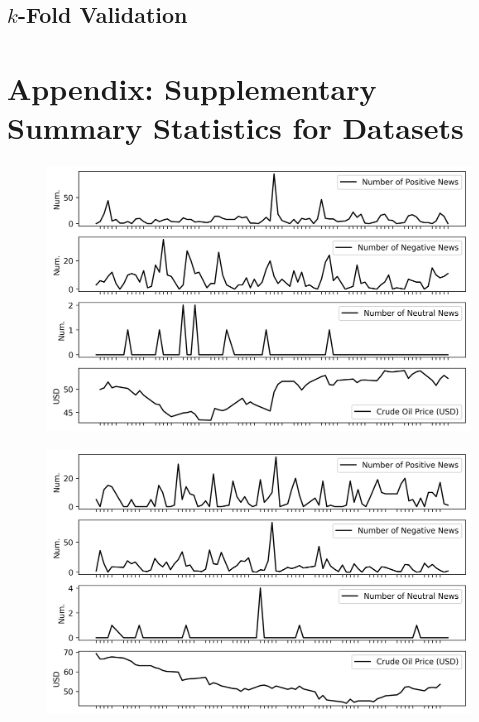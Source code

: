 \documentclass[12pt]{article}
\begin{document}
	\subsection{$k$-Fold Validation}

	
	
	

	\section{Appendix: Supplementary Summary Statistics for Datasets}
	
	\begin{figure}[H]
		\centering
		\small
		\includegraphics[width=\linewidth]{figures/case_studies/20161130_45d.png}
		\caption{}
	\end{figure}
	\begin{figure}[H]
		\centering
		\small
		\includegraphics[width=\linewidth]{figures/case_studies/20181206_45d.png}
		\caption{}
	\end{figure}
\end{document}
